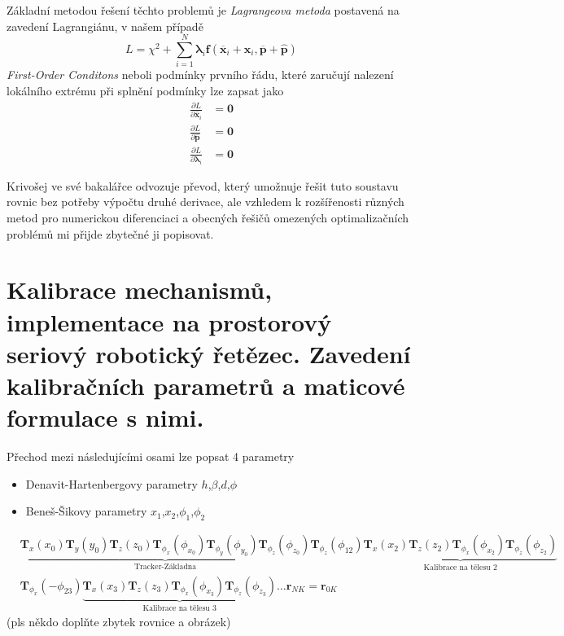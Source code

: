 \documentclass{article}
\begin{document}
	Základní metodou řešení těchto problemů je \emph{Lagrangeova metoda} postavená na zavedení Lagrangiánu, v našem případě
	\begin{equation}
		L = \chi^2 + \sum_{i=1}^N \bm{\lambda}_i \bm{f}(\bm{\overline{x}}_i+\bm{\hat{x}}_i,\bm{\overline{p}}+\bm{\hat{p}})
	\end{equation}
	\emph{First-Order Conditons} neboli podmínky prvního řádu, které zaručují nalezení lokálního extrému při splnění podmínky lze zapsat jako
	\begin{align}
		\frac{\partial L}{\partial \bm{\hat{x}}_i} &= \bm{0} \\
		\frac{\partial L}{\partial \bm{\hat{p}}} &= \bm{0} \\
		\frac{\partial L}{\partial \bm{\lambda}_i} &= \bm{0}
	\end{align}
	
	Krivošej ve své bakalářce odvozuje převod, který umožnuje řešit tuto soustavu rovnic bez potřeby výpočtu druhé derivace, ale vzhledem k rozšířenosti různých metod pro numerickou diferenciaci a obecných řešičů omezených optimalizačních problémů mi přijde zbytečné ji popisovat.

	\section{Kalibrace mechanismů, implementace na prostorový seriový robotický řetězec. Zavedení kalibračních parametrů a maticové formulace s nimi.}

	Přechod mezi následujícími osami lze popsat 4 parametry
	\begin{itemize}
		\item Denavit-Hartenbergovy parametry $h$,$\beta$,$d$,$\phi$
		\item Beneš-Šikovy parametry $x_1$,$x_2$,$\phi_1$,$\phi_2$
	\end{itemize}

	\begin{align}
		&\underbrace{
			\bm{T}_x(x_0)\bm{T}_y(y_0)\bm{T}_z(z_0)\bm{T}_{\phi_x}(\phi_{x_0})\bm{T}_{\phi_y}(\phi_{y_0})\bm{T}_{\phi_z}(\phi_{z_0})
		}_{\text{Tracker-Základna}}
		\bm{T}_{\phi_z}(\phi_{12})
		\underbrace{
			\bm{T}_x(x_2)\bm{T}_z(z_2)\bm{T}_{\phi_x}(\phi_{x_2})\bm{T}_{\phi_z}(\phi_{z_2})
		}_{\text{Kalibrace na tělesu 2}}\\&
		\bm{T}_{\phi_x}(-\phi_{23})
		\underbrace{
			\bm{T}_x(x_3)\bm{T}_z(z_3)\bm{T}_{\phi_x}(\phi_{x_3})\bm{T}_{\phi_z}(\phi_{z_3})
		}_{\text{Kalibrace na tělesu 3}}
		\ldots
		\bm{r}_{N K} = \bm{r}_{0K}
	\end{align}
	(pls někdo doplňte zbytek rovnice a obrázek)
\end{document}
